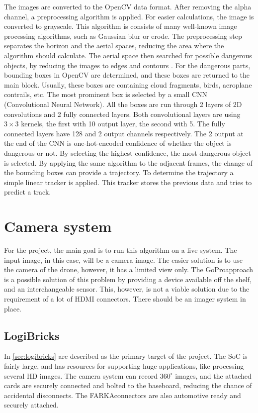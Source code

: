The images are converted to the OpenCV \cite{opencv_library} data format.
After removing the alpha channel, a preprocessing algorithm is applied.
For easier calculations, the image is converted to grayscale.
This algorithm is consists of many well-known image processing algorithms, such as Gaussian blur or erode.
The preprocessing step separates the horizon and the aerial spaces, reducing the area where the algorithm should calculate.
The aerial space then searched for possible dangerous objects, by reducing the images to edges and contours \cite{31447} \cite{SUZUKI198532}.
For the dangerous parts, bounding boxes in OpenCV are determined, and these boxes are returned to the main block.
Usually, these boxes are containing cloud fragments, birds, aeroplane contrails, etc.
The most prominent box is selected by a small CNN (Convolutional Neural Network).
All the boxes are run through 2 layers of 2D convolutions and 2 fully connected layers.
Both convolutional layers are using $3\times 3$ kernels, the first with 10 output layer, the second with 5.
The fully connected layers have 128 and 2 output channels respectively.
The 2 output at the end of the CNN is one-hot-encoded confidence of whether the object is dangerous or not.
By selecting the highest confidence, the most dangerous object is selected.
By applying the same algorithm to the adjacent frames, the change of the bounding boxes can provide a trajectory.
To determine the trajectory a simple linear tracker is applied.
This tracker stores the previous data and tries to predict a track.

\section{Camera system} %
For the project, the main goal is to run this algorithm on a live system.
The input image, in this case, will be a camera image.
The easier solution is to use the camera of the drone, however, it has a limited view only.
The GoPro\texttrademark approach is a possible solution of this problem by providing a device available off the shelf, and an interchangeable sensor.
This, however, is not a viable solution due to the requirement of a lot of HDMI connectors.
There should be an imager system in place.

\subsection{LogiBricks} %
In \cref{sec:logibricks} are described as the primary target of the project.
The SoC is fairly large, and has resources for supporting huge applications, like processing several HD images.
The camera system can record $360^{\circ}$ images, and the attached cards are securely connected and bolted to the baseboard, reducing the chance of accidental disconnects.
The FARKA\texttrademark connectors are also automotive ready and securely attached.

